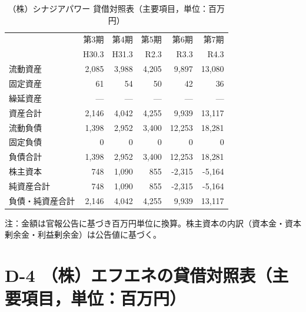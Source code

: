 \begin{table}[H]
\centering
\caption{（株）シナジアパワー 貸借対照表（主要項目，単位：百万円）}
\begin{tabular}{lrrrrr}
\toprule
 & 第3期 & 第4期 & 第5期 & 第6期 & 第7期 \\
 & H30.3 & H31.3 & R2.3 & R3.3 & R4.3 \\
\midrule
流動資産       & 2{,}085 & 3{,}988 & 4{,}205 & 9{,}897 & 13{,}080 \\
固定資産       & 61      & 54      & 50      & 42      & 36 \\
繰延資産       & —       & —       & —       & —       & — \\
\midrule
資産合計       & 2{,}146 & 4{,}042 & 4{,}255 & 9{,}939 & 13{,}117 \\
\midrule
流動負債       & 1{,}398 & 2{,}952 & 3{,}400 & 12{,}253 & 18{,}281 \\
固定負債       & 0       & 0       & 0       & 0       & 0 \\
負債合計       & 1{,}398 & 2{,}952 & 3{,}400 & 12{,}253 & 18{,}281 \\
\midrule
株主資本       & 748     & 1{,}090 & 855     & -2{,}315 & -5{,}164 \\
純資産合計     & 748     & 1{,}090 & 855     & -2{,}315 & -5{,}164 \\
\midrule
負債・純資産合計 & 2{,}146 & 4{,}042 & 4{,}255 & 9{,}939 & 13{,}117 \\
\bottomrule
\end{tabular}
\end{table}

\begin{flushleft}
\footnotesize
注：金額は官報公告に基づき百万円単位に換算。株主資本の内訳（資本金・資本剰余金・利益剰余金）は公告値に基づく。
\end{flushleft}

\section*{D-4 （株）エフエネの貸借対照表（主要項目，単位：百万円）}

